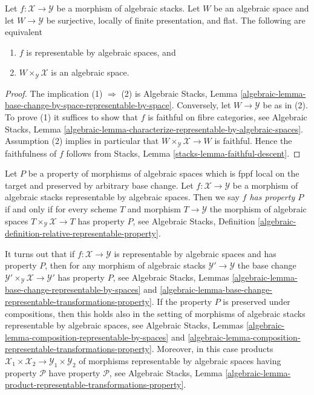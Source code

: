\begin{lemma}
\label{lemma-check-representable-covering}
Let $f : \mathcal{X} \to \mathcal{Y}$ be a morphism of algebraic stacks.
Let $W$ be an algebraic space and let $W \to \mathcal{Y}$ be surjective,
locally of finite presentation, and flat. The following are equivalent
\begin{enumerate}
\item $f$ is representable by algebraic spaces, and
\item $W \times_\mathcal{Y} \mathcal{X}$ is an algebraic space.
\end{enumerate}
\end{lemma}

\begin{proof}
The implication (1) $\Rightarrow$ (2) is
Algebraic Stacks,
Lemma \ref{algebraic-lemma-base-change-by-space-representable-by-space}.
Conversely, let $W \to \mathcal{Y}$ be as in (2). To prove (1) it
suffices to show that $f$ is faithful on fibre categories, see
Algebraic Stacks,
Lemma \ref{algebraic-lemma-characterize-representable-by-algebraic-spaces}.
Assumption (2) implies in particular that
$W \times_\mathcal{Y} \mathcal{X} \to W$ is faithful.
Hence the faithfulness of $f$ follows from
Stacks, Lemma \ref{stacks-lemma-faithful-descent}.
\end{proof}

\noindent
Let $P$ be a property of morphisms of algebraic spaces which is
fppf local on the target and preserved by arbitrary base change.
Let $f : \mathcal{X} \to \mathcal{Y}$ be a morphism of algebraic stacks
representable by algebraic spaces. Then we say
{\it $f$ has property $P$} if and only if for every scheme $T$
and morphism $T \to \mathcal{Y}$ the morphism of algebraic spaces
$T \times_\mathcal{Y} \mathcal{X} \to T$ has property $P$, see
Algebraic Stacks,
Definition \ref{algebraic-definition-relative-representable-property}.

\medskip\noindent
It turns out that if $f : \mathcal{X} \to \mathcal{Y}$ is representable
by algebraic spaces and has property $P$, then for any morphism of algebraic
stacks $\mathcal{Y}' \to \mathcal{Y}$ the base change
$\mathcal{Y}' \times_\mathcal{Y} \mathcal{X} \to \mathcal{Y}'$
has property $P$, see
Algebraic Stacks,
Lemmas \ref{algebraic-lemma-base-change-representable-by-spaces} and
\ref{algebraic-lemma-base-change-representable-transformations-property}.
If the property $P$ is preserved under compositions, then this holds
also in the setting of morphisms of algebraic stacks representable by
algebraic spaces, see
Algebraic Stacks,
Lemmas \ref{algebraic-lemma-composition-representable-by-spaces} and
\ref{algebraic-lemma-composition-representable-transformations-property}.
Moreover, in this case products
$\mathcal{X}_1 \times \mathcal{X}_2 \to \mathcal{Y}_1 \times \mathcal{Y}_2$
of morphisms representable by algebraic spaces having property $\mathcal{P}$
have property $\mathcal{P}$, see
Algebraic Stacks, Lemma
\ref{algebraic-lemma-product-representable-transformations-property}.

